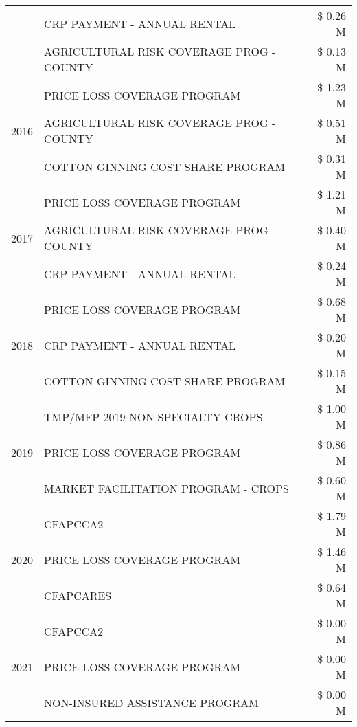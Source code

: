 \begin{tabular}{llr}
 & CRP PAYMENT - ANNUAL RENTAL & \$ 0.26 M \\
 & AGRICULTURAL RISK COVERAGE PROG - COUNTY & \$ 0.13 M \\
\cline{1-3}
\multirow[t]{3}{*}{2016} & PRICE LOSS COVERAGE PROGRAM & \$ 1.23 M \\
 & AGRICULTURAL RISK COVERAGE PROG - COUNTY & \$ 0.51 M \\
 & COTTON GINNING COST SHARE PROGRAM & \$ 0.31 M \\
\cline{1-3}
\multirow[t]{3}{*}{2017} & PRICE LOSS COVERAGE PROGRAM & \$ 1.21 M \\
 & AGRICULTURAL RISK COVERAGE PROG - COUNTY & \$ 0.40 M \\
 & CRP PAYMENT - ANNUAL RENTAL & \$ 0.24 M \\
\cline{1-3}
\multirow[t]{3}{*}{2018} & PRICE LOSS COVERAGE PROGRAM & \$ 0.68 M \\
 & CRP PAYMENT - ANNUAL RENTAL & \$ 0.20 M \\
 & COTTON GINNING COST SHARE PROGRAM & \$ 0.15 M \\
\cline{1-3}
\multirow[t]{3}{*}{2019} & TMP/MFP 2019 NON SPECIALTY CROPS & \$ 1.00 M \\
 & PRICE LOSS COVERAGE PROGRAM & \$ 0.86 M \\
 & MARKET FACILITATION PROGRAM - CROPS & \$ 0.60 M \\
\cline{1-3}
\multirow[t]{3}{*}{2020} & CFAPCCA2 & \$ 1.79 M \\
 & PRICE LOSS COVERAGE PROGRAM & \$ 1.46 M \\
 & CFAPCARES & \$ 0.64 M \\
\cline{1-3}
\multirow[t]{3}{*}{2021} & CFAPCCA2 & \$ 0.00 M \\
 & PRICE LOSS COVERAGE PROGRAM & \$ 0.00 M \\
 & NON-INSURED ASSISTANCE PROGRAM & \$ 0.00 M \\
\cline{1-3}
\bottomrule
\end{tabular}
